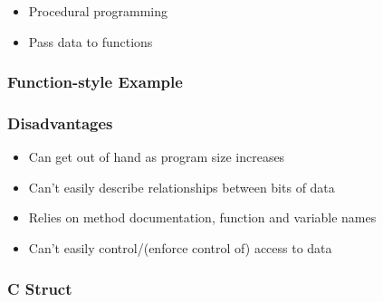 \begin{itemize}
\itemsep1pt\parskip0pt
\item
  Procedural programming
\item
  Pass data to functions
\end{itemize}

\subsubsection{Function-style Example}\label{function-style-example}

\begin{Shaded}
\begin{Highlighting}[]

   
\NormalTok{\{}
\NormalTok{\}}

 
\NormalTok{\{}
\NormalTok{\}}

   
\NormalTok{\{}
\NormalTok{\}}
\end{Highlighting}
\end{Shaded}

\subsubsection{Disadvantages}\label{disadvantages}

\begin{itemize}
\itemsep1pt\parskip0pt
\item
  Can get out of hand as program size increases
\item
  Can't easily describe relationships between bits of data
\item
  Relies on method documentation, function and variable names
\item
  Can't easily control/(enforce control of) access to data
\end{itemize}

\subsubsection{C Struct}\label{c-struct}

